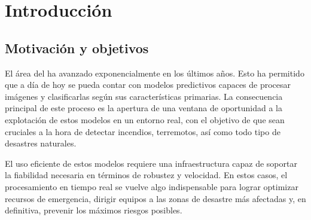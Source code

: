 \cleardoublepage


\chapter{Introducción}
\label{ch:chapter1}


\section{Motivación y objetivos}\label{sec:motivación-y-objetivos}

El área del  ha avanzado exponencialmente en los últimos años.
Esto ha permitido que a día de hoy se pueda contar con modelos predictivos capaces de procesar imágenes y clasificarlas según sus características primarias.
La consecuencia principal de este proceso es la apertura de una ventana de oportunidad a la explotación de estos modelos en un entorno real, con el objetivo de que sean cruciales a
la hora de detectar incendios, terremotos, así como todo tipo de desastres naturales.


El uso eficiente de estos modelos requiere una infraestructura capaz de soportar la fiabilidad necesaria en términos de robustez y velocidad.
En estos casos, el procesamiento en tiempo real se vuelve algo indispensable para lograr optimizar recursos de emergencia, dirigir equipos a las zonas de desastre más afectadas y, en definitiva, prevenir los máximos riesgos posibles.


